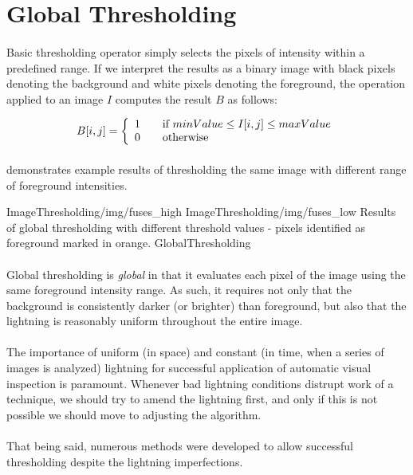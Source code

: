 \section{Global Thresholding}

\paragraph*{}
Basic thresholding operator simply selects the pixels of intensity within a predefined range. If we interpret the results as a binary image with black pixels denoting the background and white pixels denoting the foreground, the operation applied to an image $I$ computes the result $B$ as follows:

\[
B[i,j] = \left\{ 
  \begin{array}{l l}
    1 & \quad \text{if } minValue \leq I[i,j] \leq maxValue \\
    0 & \quad \text{otherwise} \\
  \end{array} \right.
\]

\paragraph*{}
 demonstrates example results of thresholding the same image with different range of foreground intensities.

\twoFigures
{ImageThresholding/img/fuses_high}
{ImageThresholding/img/fuses_low}
{Results of global thresholding with different threshold values - pixels identified as foreground marked in orange.}
{GlobalThresholding}
{\basicWidth}

\paragraph*{}
Global thresholding is \textit{global} in that it evaluates each pixel of the image using the same foreground intensity range. As such, it requires not only that the background is consistently darker (or brighter) than foreground, but also that the lightning is reasonably uniform throughout the entire image.

\paragraph*{}
The importance of uniform (in space) and constant (in time, when a series of images is analyzed) lightning for successful application of automatic visual inspection is paramount. Whenever bad lightning conditions distrupt work of a technique, we should try to amend the lightning first, and only if this is not possible we should move to adjusting the algorithm. 

\paragraph*{}
That being said, numerous methods were developed to allow successful thresholding despite the lightning imperfections.
